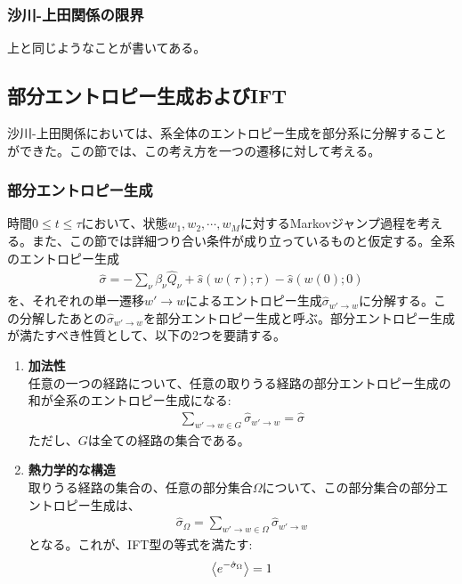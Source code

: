 \documentclass[a4paper,11pt]{jsarticle}
\numberwithin{equation}{section}
\begin{document}
\subsubsection{沙川-上田関係の限界}
上と同じようなことが書いてある。\\

\subsection{部分エントロピー生成およびIFT}
沙川-上田関係においては、系全体のエントロピー生成を部分系に分解することができた。この節では、この考え方を一つの遷移に対して考える。\\
\subsubsection{部分エントロピー生成}
時間$0 \leq t \leq \tau$において、状態$w_1, w_2, \cdots, w_M$に対するMarkovジャンプ過程を考える。また、この節では詳細つり合い条件が成り立っているものと仮定する。全系のエントロピー生成
\begin{align}
    \hat{\sigma} = -\sum_{\nu} \beta_{\nu} \hat{Q}_{\nu} + \hat{s}(w(\tau); \tau) - \hat{s}(w(0); 0)
\end{align}
を、それぞれの単一遷移$w' \to w$によるエントロピー生成$\hat{\sigma}_{w' \to w}$に分解する。この分解したあとの$\hat{\sigma}_{w' \to w}$を部分エントロピー生成と呼ぶ。部分エントロピー生成が満たすべき性質として、以下の2つを要請する。
\begin{enumerate}
    \item \textbf{加法性}\\
    任意の一つの経路について、任意の取りうる経路の部分エントロピー生成の和が全系のエントロピー生成になる:
    \begin{align}
        \sum_{w'\to w\in G} \hat{\sigma}_{w' \to w} = \hat{\sigma}
    \end{align}
    ただし、$G$は全ての経路の集合である。
    \item \textbf{熱力学的な構造}\\
    取りうる経路の集合の、任意の部分集合$\Omega$について、この部分集合の部分エントロピー生成は、
    \begin{align}
        \hat{\sigma}_{\Omega} = \sum_{w' \to w \in \Omega} \hat{\sigma}_{w' \to w}
    \end{align}
    となる。これが、IFT型の等式を満たす:
    \begin{align}
        \ev{e^{-\hat{\sigma}_{\Omega}}} = 1
    \end{align}
\end{enumerate}
\end{document}
